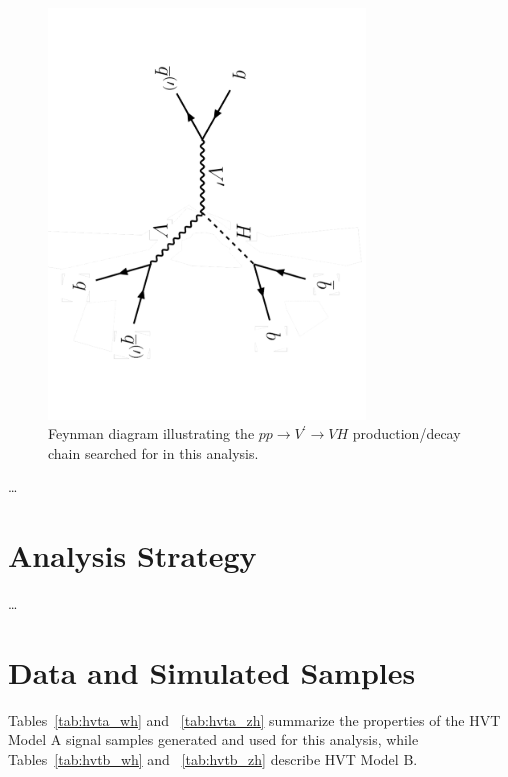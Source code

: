 \begin{figure}
	\centering
	\includegraphics[width=0.75\textwidth,angle=90,origin=c]{feynman_diagram_VHqqbb}
	\caption{
	Feynman diagram illustrating the $pp \rightarrow V^\prime \rightarrow VH$ production/decay chain searched for in this analysis.
	}
	\label{fig:feynman_diagram_VHqqbb}
\end{figure}

\dots

\section{Analysis Strategy}
\dots

\section{Data and Simulated Samples}

Tables~\ref{tab:hvta_wh} and ~\ref{tab:hvta_zh} summarize the properties of the HVT Model A signal samples generated and used for this analysis, while Tables~\ref{tab:hvtb_wh} and ~\ref{tab:hvtb_zh} describe HVT Model B.

